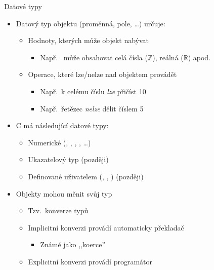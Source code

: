\begin{frame}{Datové typy}

  \begin{itemize}
    \item Datový typ objektu (proměnná, pole, \dots) určuje:
    \begin{itemize}
      \item Hodnoty, kterých může objekt nabývat
      \begin{itemize}
	\item Např.\  může obsahovat celá čísla ($\mathbb{Z}$),
	   reálná ($\mathbb{R}$) apod.
      \end{itemize}

      \pause

      \item Operace, které lze/nelze nad objektem provádět
      \begin{itemize}
	\item Např.\ k celému číslu \emph{lze} přičíst 10
	\item Např.\ řetězec \emph{nelze} dělit číslem 5
      \end{itemize}

    \end{itemize}

    \pause

    \item C má následující datové typy:
    \begin{itemize}
      \item Numerické (, , , ,
        \dots)

      \pause

      \item Ukazatelový typ (později)

      \pause

      \item Definované uživatelem (, , )
        (později)
    \end{itemize}

    \pause

    \item Objekty mohou měnit svůj typ
    \begin{itemize}
      \item Tzv.\ konverze typů

      \pause

      \item Implicitní konverzi provádí automaticky překladač
      \begin{itemize}
        \item Známé jako ,,koerce''
      \end{itemize}

      \pause

      \item Explicitní konverzi provádí programátor
    \end{itemize}

  \end{itemize}

\end{frame}

